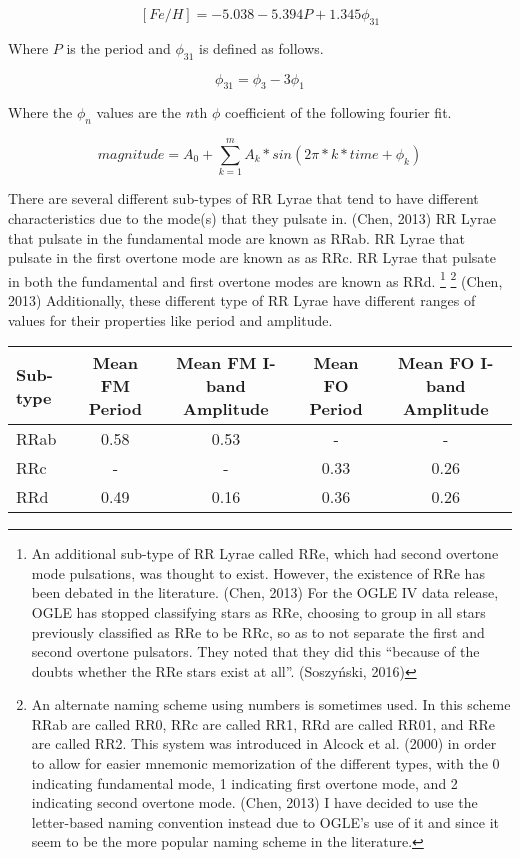 \documentclass[]{article}
\begin{document}
$$
[Fe/H] = -5.038 - 5.394 P + 1.345 \phi_{31}
$$

Where $P$ is the period and $\phi_{31}$ is defined as follows. \cite{bhardwaj_2018}

$$
\phi_{31} = \phi_{3} - 3\phi_{1}
$$

Where the $\phi_{n}$ values are the $n$th $\phi$ coefficient of the following fourier fit.

$$
magnitude = A_{0} + \sum_{k=1}^{m} A_k * sin(2\pi * k * time + \phi_{k})
$$

There are several different sub-types of RR Lyrae that tend to have different characteristics due to the mode(s) that they pulsate in. (Chen, 2013) RR Lyrae that pulsate in the fundamental mode are known as RRab. RR Lyrae that pulsate in the first overtone mode are known as as RRc. RR Lyrae that pulsate in both the fundamental and first overtone modes are known as RRd. \footnote{An additional sub-type of RR Lyrae called RRe, which had second overtone mode pulsations, was thought to exist. However, the existence of RRe has been debated in the literature. (Chen, 2013) For the OGLE IV data release, OGLE has stopped classifying stars as RRe, choosing to group in all stars previously classified as RRe to be RRc, so as to not separate the first and second overtone pulsators. They noted that they did this ``because of the doubts whether the RRe stars exist at all''. (Soszyński, 2016)} \footnote{An alternate naming scheme using numbers is sometimes used. In this scheme RRab are called RR0, RRc are called RR1, RRd are called RR01, and RRe are called RR2. This system was introduced in Alcock et al. (2000) in order to allow for easier mnemonic memorization of the different types, with the 0 indicating fundamental mode, 1 indicating first overtone mode, and 2 indicating second overtone mode. (Chen, 2013) I have decided to use the letter-based naming convention instead due to OGLE’s use of it and since it seem to be the more popular naming scheme in the literature.} (Chen, 2013) Additionally, these different type of RR Lyrae have different ranges of values for their properties like period and amplitude.


\begin{center}
\begin{tabular}{|l|c|c|c|c|}
	\hline
	Sub-type & Mean FM Period & Mean FM I-band Amplitude & Mean FO Period & Mean FO I-band Amplitude \\
	\hline
	RRab & 0.58 & 0.53 & - & - \\
	RRc & - & - & 0.33 & 0.26 \\
	RRd & 0.49 & 0.16 & 0.36 & 0.26 \\
	\hline
\end{tabular}
\end{center}
\end{document}
